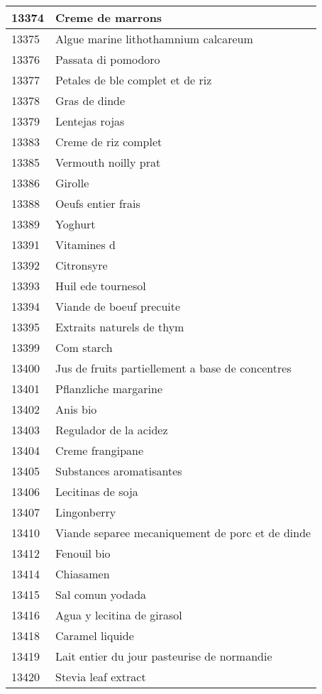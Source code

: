 \begin{longtable}{|l|l|}
13374 & Creme de marrons \\ \hline 
13375 & Algue marine lithothamnium calcareum \\ \hline 
13376 & Passata di pomodoro \\ \hline 
13377 & Petales de ble complet et de riz \\ \hline 
13378 & Gras de dinde \\ \hline 
13379 & Lentejas rojas \\ \hline 
13383 & Creme de riz complet \\ \hline 
13385 & Vermouth noilly prat \\ \hline 
13386 & Girolle \\ \hline 
13388 & Oeufs entier frais \\ \hline 
13389 & Yoghurt \\ \hline 
13391 & Vitamines d \\ \hline 
13392 & Citronsyre \\ \hline 
13393 & Huil ede tournesol \\ \hline 
13394 & Viande de boeuf precuite \\ \hline 
13395 & Extraits naturels de thym \\ \hline 
13399 & Com starch \\ \hline 
13400 & Jus de fruits partiellement a base de concentres \\ \hline 
13401 & Pflanzliche margarine \\ \hline 
13402 & Anis bio \\ \hline 
13403 & Regulador de la acidez \\ \hline 
13404 & Creme frangipane \\ \hline 
13405 & Substances aromatisantes \\ \hline 
13406 & Lecitinas de soja \\ \hline 
13407 & Lingonberry \\ \hline 
13410 & Viande separee mecaniquement de porc et de dinde \\ \hline 
13412 & Fenouil bio \\ \hline 
13414 & Chiasamen \\ \hline 
13415 & Sal comun yodada \\ \hline 
13416 & Agua y lecitina de girasol \\ \hline 
13418 & Caramel liquide \\ \hline 
13419 & Lait entier du jour pasteurise de normandie \\ \hline 
13420 & Stevia leaf extract \\ \hline 

\end{longtable}
